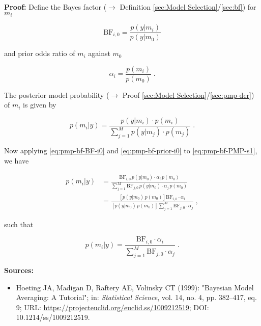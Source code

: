 \documentclass[a4paper,12pt,twoside]{book}
\begin{document}
\vspace{1em}
\textbf{Proof:} Define the Bayes factor ($\rightarrow$ Definition \ref{sec:Model Selection}/\ref{sec:bf}) for $m_i$

\begin{equation} \label{eq:pmp-bf-BF-i0}
\mathrm{BF}_{i,0} = \frac{p(y|m_i)}{p(y|m_0)}
\end{equation}

and prior odds ratio of $m_i$ against $m_0$

\begin{equation} \label{eq:pmp-bf-prior-i0}
\alpha_i = \frac{p(m_i)}{p(m_0)} \; .
\end{equation}

The posterior model probability ($\rightarrow$ Proof \ref{sec:Model Selection}/\ref{sec:pmp-der}) of $m_i$ is given by

\begin{equation} \label{eq:pmp-bf-PMP-s1}
p(m_i|y) = \frac{p(y|m_i) \cdot p(m_i)}{\sum_{j=1}^{M} p(y|m_j) \cdot p(m_j)} \; .
\end{equation}

Now applying \eqref{eq:pmp-bf-BF-i0} and \eqref{eq:pmp-bf-prior-i0} to \eqref{eq:pmp-bf-PMP-s1}, we have

\begin{equation} \label{eq:pmp-bf-PMP-s2}
\begin{split}
p(m_i|y) &= \frac{ \mathrm{BF}_{i,0} \, p(y|m_0) \cdot \alpha_i \, p(m_0)}{\sum_{j=1}^{M} \mathrm{BF}_{j,0} \, p(y|m_0) \cdot \alpha_j \, p(m_0)} \\
&= \frac{\left[ p(y|m_0) \, p(m_0) \right] \mathrm{BF}_{i,0} \cdot \alpha_i}{\left[ p(y|m_0) \, p(m_0) \right] \sum_{j=1}^{M} \mathrm{BF}_{j,0} \cdot \alpha_j} \; ,
\end{split}
\end{equation}

such that

\begin{equation} \label{eq:pmp-bf-PMP-BF-qed}
p(m_i|y)= \frac{\mathrm{BF}_{i,0} \cdot \alpha_i}{\sum_{j=1}^{M} \mathrm{BF}_{j,0} \cdot \alpha_j} \; .
\end{equation}


\vspace{1em}
\textbf{Sources:}
\begin{itemize}
\item Hoeting JA, Madigan D, Raftery AE, Volinsky CT (1999): "Bayesian Model Averaging: A Tutorial"; in: \textit{Statistical Science}, vol. 14, no. 4, pp. 382–417, eq. 9; URL: \url{https://projecteuclid.org/euclid.ss/1009212519}; DOI: 10.1214/ss/1009212519.
\end{itemize}
\end{document}
